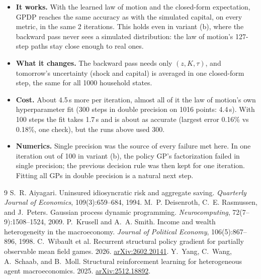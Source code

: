 \documentclass[11pt,a4paper]{article}
\begin{document}
\begin{itemize}
\item \textbf{It works.} With the learned law of motion and the closed-form expectation, GPDP
  reaches the same accuracy as with the simulated capital, on every metric, in the same 2
  iterations. This holds even in variant (b), where the backward pass never sees a simulated
  distribution: the law of motion's 127-step paths stay close enough to real ones.
\item \textbf{What it changes.} The backward pass needs only $(z, K, \tau)$, and tomorrow's
  uncertainty (shock and capital) is averaged in one closed-form step, the same for all 1000
  household states.
\item \textbf{Cost.} About 4.5\,s more per iteration, almost all of it the law of motion's own
  hyperparameter fit (300 steps in double precision on 1016 points: 4.4\,s). With 100 steps the
  fit takes 1.7\,s and is about as accurate (largest error 0.16\% vs 0.18\%, one check), but the
  runs above used 300.
\item \textbf{Numerics.} Single precision was the source of every failure met here. In one
  iteration out of 100 in variant (b), the policy GP's factorization failed in single precision; the
  previous decision rule was then kept for one iteration. Fitting all GPs in double precision is a
  natural next step.
\end{itemize}

\begin{thebibliography}{9}
S.~R. Aiyagari. Uninsured idiosyncratic risk and aggregate saving.
\emph{Quarterly Journal of Economics}, 109(3):659--684, 1994.
M.~P. Deisenroth, C.~E. Rasmussen, and J.~Peters.
Gaussian process dynamic programming.
\emph{Neurocomputing}, 72(7--9):1508--1524, 2009.
P.~Krusell and A.~A. Smith.
Income and wealth heterogeneity in the macroeconomy.
\emph{Journal of Political Economy}, 106(5):867--896, 1998.
C.~Wibault et al.
Recurrent structural policy gradient for partially observable mean field games.
2026. \href{https://arxiv.org/abs/2602.20141}{arXiv:2602.20141}.
Y.~Yang, C.~Wang, A.~Schaab, and B.~Moll.
Structural reinforcement learning for heterogeneous agent macroeconomics.
2025. \href{https://arxiv.org/abs/2512.18892}{arXiv:2512.18892}.
\end{thebibliography}
\end{document}
